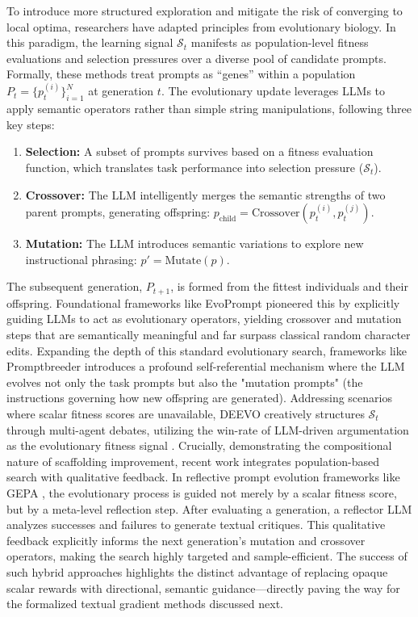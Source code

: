 \documentclass{article}
\begin{document}
To introduce more structured exploration and mitigate the risk of converging to local optima, researchers have adapted principles from evolutionary biology. In this paradigm, the learning signal $\mathcal{S}_t$ manifests as population-level fitness evaluations and selection pressures over a diverse pool of candidate prompts. Formally, these methods treat prompts as ``genes'' within a population $P_t = \{p_t^{(i)}\}_{i=1}^{N}$ at generation $t$. The evolutionary update leverages LLMs to apply semantic operators rather than simple string manipulations, following three key steps:
\begin{enumerate}
\item \textbf{Selection:} A subset of prompts survives based on a fitness evaluation function, which translates task performance into selection pressure ($\mathcal{S}_t$).
\item \textbf{Crossover:} The LLM intelligently merges the semantic strengths of two parent prompts, generating offspring: $p_{\text{child}} = \text{Crossover}(p_t^{(i)}, p_t^{(j)})$.
\item \textbf{Mutation:} The LLM introduces semantic variations to explore new instructional phrasing: $p' = \text{Mutate}(p)$.
\end{enumerate}
The subsequent generation, $P_{t+1}$, is formed from the fittest individuals and their offspring. Foundational frameworks like EvoPrompt \citep{guo2025evopromptconnectingllmsevolutionary} pioneered this by explicitly guiding LLMs to act as evolutionary operators, yielding crossover and mutation steps that are semantically meaningful and far surpass classical random character edits. Expanding the depth of this standard evolutionary search, frameworks like Promptbreeder \citep{fernando2024promptbreeder} introduces a profound self-referential mechanism where the LLM evolves not only the task prompts but also the "mutation prompts" (the instructions governing how new offspring are generated). Addressing scenarios where scalar fitness scores are unavailable, DEEVO creatively structures $\mathcal{S}_t$ through multi-agent debates, utilizing the win-rate of LLM-driven argumentation as the evolutionary fitness signal \citep{nair2025tournamentpromptsevolvingllm}. Crucially, demonstrating the compositional nature of scaffolding improvement, recent work integrates population-based search with qualitative feedback. In reflective prompt evolution frameworks like GEPA \citep{agrawal2025gepareflectivepromptevolution}, the evolutionary process is guided not merely by a scalar fitness score, but by a meta-level reflection step. After evaluating a generation, a reflector LLM analyzes successes and failures to generate textual critiques. This qualitative feedback explicitly informs the next generation's mutation and crossover operators, making the search highly targeted and sample-efficient. The success of such hybrid approaches highlights the distinct advantage of replacing opaque scalar rewards with directional, semantic guidance—directly paving the way for the formalized textual gradient methods discussed next.
\end{document}
